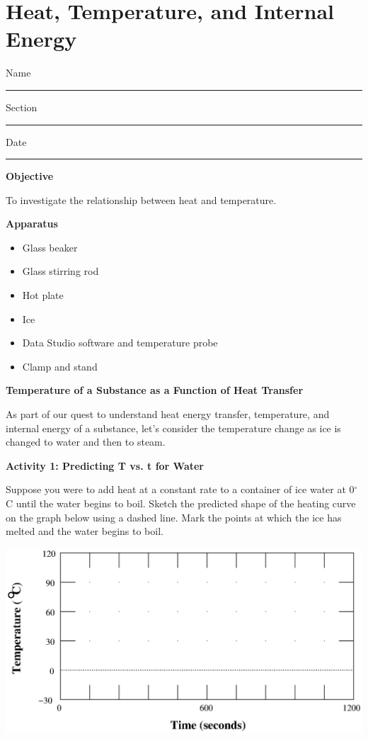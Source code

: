 
\section{Heat, Temperature, and Internal Energy}

Name \rule{2.0in}{0.1pt}\hfill{}Section \rule{1.0in}{0.1pt}\hfill{}Date
\rule{1.0in}{0.1pt}

\textbf{Objective}

To investigate the relationship between heat and temperature.

\textbf{Apparatus}

\begin{itemize}
\item Glass beaker 
\item Glass stirring rod
\item Hot plate
\item Ice
\item Data Studio software and temperature probe
\item Clamp and stand
\end{itemize}
\textbf{Temperature of a Substance as a Function of Heat Transfer}

As part of our quest to understand heat energy transfer, temperature,
and internal energy of a substance, let's consider the temperature
change as ice is changed to water and then to steam.

\textbf{Activity 1: Predicting T vs. t for Water} 

Suppose you were to add heat at a constant rate to a container of
ice water at 0\( ^{\circ } \)C until the water begins to boil. Sketch
the predicted shape of the heating curve on the graph below using
a dashed line. Mark the points at which the ice has melted and the
water begins to boil.

\vspace{0.3cm}
{\centering \includegraphics{heat_temp_int_energy_fig_1.eps} \par}
\vspace{0.3cm}

